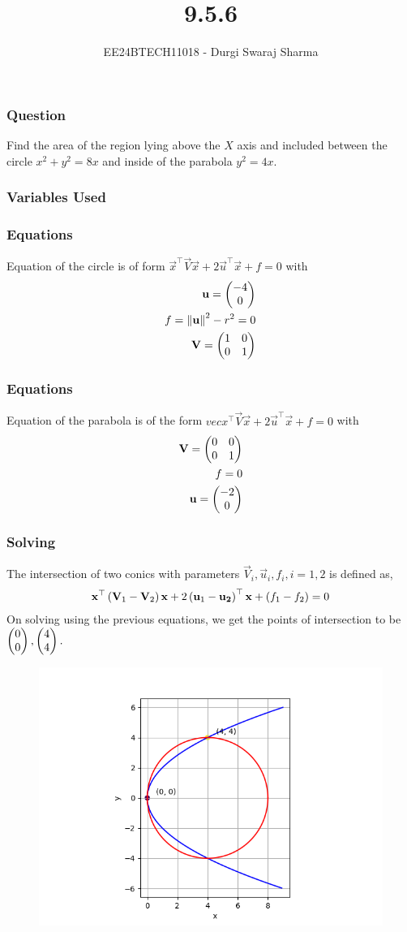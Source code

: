 \documentclass{beamer}
\begin{document}
\title{9.5.6}
\author{EE24BTECH11018 - Durgi Swaraj Sharma}
\date{}
\frame{\titlepage}

\begin{frame}
\frametitle{Question}
Find the area of the region lying above the $X$ axis and included between the circle $x^2+y^2=8x$ and inside of the parabola $y^2=4x$. \hfill {}
\end{frame}

\begin{frame}
\frametitle{Variables Used}
\begin{table}[h!] 
  \centering
  
  \label{tab9-5.6-1}
\end{table}
\end{frame}
\begin{frame}
\frametitle{Equations}
Equation of the circle is of form $\vec{x}^{\top}\vec{V}\vec{x}+2\vec{u}^{\top}\vec{x}+f=0$ with
\begin{align}
	\mathbf{u}=\begin{pmatrix}-4\\0\end{pmatrix}\\
	f=\left\lVert\mathbf{u}\right\rVert^2-r^2=0\\
	\mathbf{V}=\begin{pmatrix}1&0\\0&1\end{pmatrix}
\end{align}
\end{frame}
\begin{frame}
	\frametitle{Equations}
Equation of the parabola is of the form $vec{x}^{\top}\vec{V}\vec{x}+2\vec{u}^{\top}\vec{x}+f=0$ with
\begin{align}
	\mathbf{V}=\begin{pmatrix}0&0\\0&1\end{pmatrix}\\
	f=0\\
	\mathbf{u}=\begin{pmatrix}-2\\0\end{pmatrix}
\end{align}
\end{frame}
\begin{frame}
	\frametitle{Solving}
The intersection of two conics with parameters $\vec{V}_i,\vec{u}_i,f_i, i=1,2$ is defined as,
\begin{align}
	\mathbf{x}^{\top}\left(\mathbf{V}_1-\mathbf{V}_2\right)\mathbf{x}+2\left(\mathbf{u}_1-\mathbf{u_2}\right)^{\top}\mathbf{x}+\left(f_1-f_2\right)=0
\end{align} 
On solving using the previous equations, we get the points of intersection to be $\begin{pmatrix}0\\0\end{pmatrix},\begin{pmatrix}4\\4\end{pmatrix}.$
\begin{figure}[h!]
   \centering
   \includegraphics[width = 0.5\linewidth]{figs/fig1.png}
   \label{stemplot}
\end{figure}
\end{frame}
\end{document}
